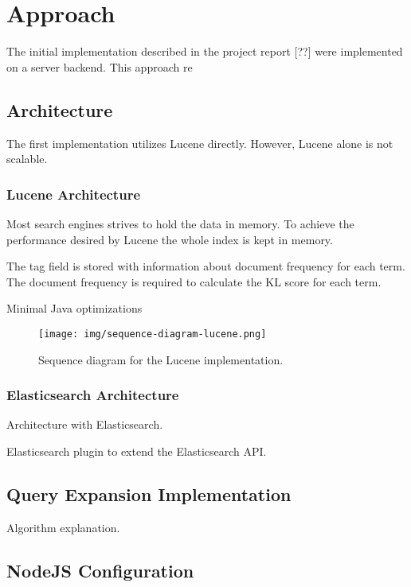 \chapter{Approach}
\label{ch:approach}
The initial implementation described in the project report [??] were implemented on a server backend.
This approach re

\section{Architecture}
The first implementation utilizes Lucene directly.
However, Lucene alone is not scalable.

\subsection{Lucene Architecture}
Most search engines strives to hold the data in memory.
To achieve the performance desired by Lucene the whole index is kept in memory.

The tag field is stored with information about document frequency for each term.
The document frequency is required to calculate the KL score for each term.

Minimal Java optimizations

\begin{figure}[h!]
\centering \texttt{[image: img/sequence-diagram-lucene.png]}
\caption{Sequence diagram for the Lucene implementation.}
\label{fig:sequence-diagram-lucene}
\end{figure}

\subsection{Elasticsearch Architecture}
Architecture with Elasticsearch.

Elasticsearch plugin to extend the Elasticsearch API.

\section{Query Expansion Implementation}
Algorithm explanation.

\section{NodeJS Configuration}
